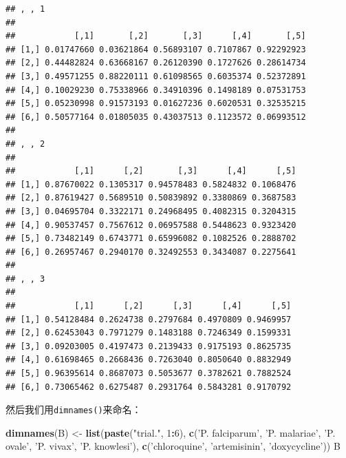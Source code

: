 \documentclass[]{book}
\newenvironment{Shaded}{\begin{snugshade}}{\end{snugshade}}
\newcommand{\DecValTok}[1]{\textcolor[rgb]{0.00,0.00,0.81}{#1}}
\newcommand{\KeywordTok}[1]{\textcolor[rgb]{0.13,0.29,0.53}{\textbf{#1}}}
\newcommand{\NormalTok}[1]{#1}
\newcommand{\OperatorTok}[1]{\textcolor[rgb]{0.81,0.36,0.00}{\textbf{#1}}}
\newcommand{\StringTok}[1]{\textcolor[rgb]{0.31,0.60,0.02}{#1}}
\begin{document}
\begin{verbatim}
## , , 1
## 
##            [,1]       [,2]       [,3]      [,4]       [,5]
## [1,] 0.01747660 0.03621864 0.56893107 0.7107867 0.92292923
## [2,] 0.44482824 0.63668167 0.26120390 0.1727626 0.28614734
## [3,] 0.49571255 0.88220111 0.61098565 0.6035374 0.52372891
## [4,] 0.10029230 0.75338966 0.34910396 0.1498189 0.07531753
## [5,] 0.05230998 0.91573193 0.01627236 0.6020531 0.32535215
## [6,] 0.50577164 0.01805035 0.43037513 0.1123572 0.06993512
## 
## , , 2
## 
##            [,1]      [,2]       [,3]      [,4]      [,5]
## [1,] 0.87670022 0.1305317 0.94578483 0.5824832 0.1068476
## [2,] 0.87619427 0.5689510 0.50839892 0.3380869 0.3687583
## [3,] 0.04695704 0.3322171 0.24968495 0.4082315 0.3204315
## [4,] 0.90537457 0.7567612 0.06957588 0.5448623 0.9323420
## [5,] 0.73482149 0.6743771 0.65996082 0.1082526 0.2888702
## [6,] 0.26957467 0.2940170 0.32492553 0.3434087 0.2275641
## 
## , , 3
## 
##            [,1]      [,2]      [,3]      [,4]      [,5]
## [1,] 0.54128484 0.2624738 0.2797684 0.4970809 0.9469957
## [2,] 0.62453043 0.7971279 0.1483188 0.7246349 0.1599331
## [3,] 0.09203005 0.4197473 0.2139433 0.9175193 0.8625735
## [4,] 0.61698465 0.2668436 0.7263040 0.8050640 0.8832949
## [5,] 0.96395614 0.8687073 0.5053677 0.3782621 0.7882524
## [6,] 0.73065462 0.6275487 0.2931764 0.5843281 0.9170792
\end{verbatim}

然后我们用\texttt{dimnames()}来命名：

\begin{Shaded}
\begin{Highlighting}[]
\KeywordTok{dimnames}\NormalTok{(B) <-}\StringTok{ }\KeywordTok{list}\NormalTok{(}\KeywordTok{paste}\NormalTok{(}\StringTok{"trial."}\NormalTok{, }\DecValTok{1}\OperatorTok{:}\DecValTok{6}\NormalTok{), }\KeywordTok{c}\NormalTok{(}\StringTok{'P. falciparum'}\NormalTok{, }\StringTok{'P. malariae'}\NormalTok{, }\StringTok{'P. ovale'}\NormalTok{, }\StringTok{'P. vivax'}\NormalTok{, }\StringTok{'P. knowlesi'}\NormalTok{), }\KeywordTok{c}\NormalTok{(}\StringTok{'chloroquine'}\NormalTok{, }\StringTok{'artemisinin'}\NormalTok{, }\StringTok{'doxycycline'}\NormalTok{))}
\NormalTok{B}
\end{Highlighting}
\end{Shaded}
\end{document}
